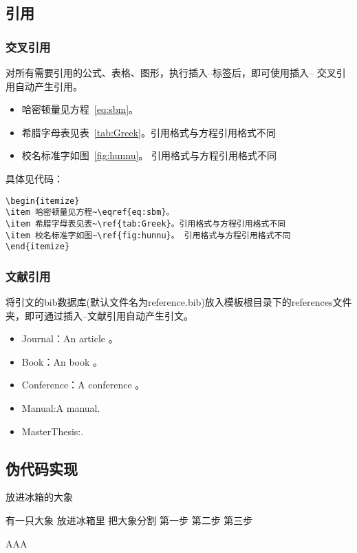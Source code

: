 \subsection{引用}
\subsubsection{交叉引用}
对所有需要引用的公式、表格、图形，执行插入--标签后，即可使用插入-- 交叉引用自动产生引用。
\begin{itemize}
\item 哈密顿量见方程~\eqref{eq:sbm}。
\item 希腊字母表见表~\ref{tab:Greek}。引用格式与方程引用格式不同
\item 校名标准字如图~\ref{fig:hunnu}。 引用格式与方程引用格式不同
\end{itemize}
具体见代码：
\begin{verbatim}
\begin{itemize}
\item 哈密顿量见方程~\eqref{eq:sbm}。
\item 希腊字母表见表~\ref{tab:Greek}。引用格式与方程引用格式不同
\item 校名标准字如图~\ref{fig:hunnu}。 引用格式与方程引用格式不同
\end{itemize}
\end{verbatim}
\subsubsection{文献引用}
将引文的bib数据库(默认文件名为reference.bib)放入模板根目录下的references文件夹，即可通过插入--文献引用自动产生引文。
\begin{itemize}
\item Journal：An article 。
\item Book：An book \cite{IEEE-1363,tex,companion}。
\item Conference：A conference \cite{kocher99,DPMG,cnproceed}。
\item Manual:A manual\cite{NPB2}.
\item MasterThesis:\cite{zhubajie,metamori2004,shaheshang,FistSystem01}.
\end{itemize}
\subsection{伪代码实现}
\begin{algorithm}
\caption{放进冰箱的大象}\label{算法实例}
\begin{algorithmic}
	\REQUIRE 有一只大象
	\ENSURE 放进冰箱里
	\STATE 把大象分割
	\ENDIF
	\ENDFOR
	\STATE 第一步
	\STATE 第二步
	\STATE 第三步
\end{algorithmic}
AAA\end{algorithm}
